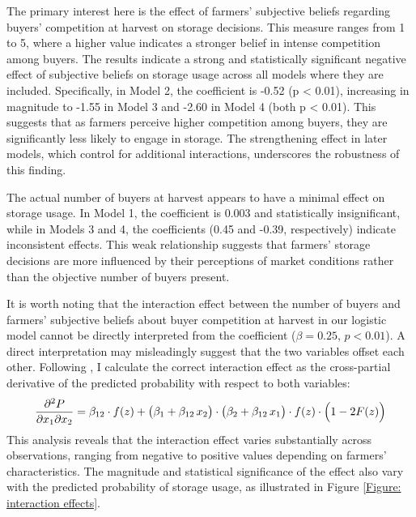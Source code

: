 \documentclass[12pt]{article}
\begin{document}


The primary interest here is the effect of farmers' subjective beliefs regarding buyers' competition at harvest on storage decisions. This measure ranges from 1 to 5, where a higher value indicates a stronger belief in intense competition among buyers. The results indicate a strong and statistically significant negative effect of subjective beliefs on storage usage across all models where they are included. Specifically, in Model 2, the coefficient is -0.52 (p < 0.01), increasing in magnitude to -1.55 in Model 3 and -2.60 in Model 4 (both p < 0.01). This suggests that as farmers perceive higher competition among buyers, they are significantly less likely to engage in storage. The strengthening effect in later models, which control for additional interactions, underscores the robustness of this finding.

The actual number of buyers at harvest appears to have a minimal effect on storage usage. In Model 1, the coefficient is 0.003 and statistically insignificant, while in Models 3 and 4, the coefficients (0.45 and -0.39, respectively) indicate inconsistent effects. This weak relationship suggests that farmers' storage decisions are more influenced by their perceptions of market conditions rather than the objective number of buyers present.

It is worth noting that the interaction effect between the number of buyers and farmers' subjective beliefs about buyer competition at harvest in our logistic model cannot be directly interpreted from the coefficient ($\beta = 0.25$, $p < 0.01$). A direct interpretation may misleadingly suggest that the two variables offset each other. Following \cite{ai2003interaction}, I calculate the correct interaction effect as the cross-partial derivative of the predicted probability with respect to both variables: $$\frac{\partial^2 P}{\partial x_1 \partial x_2} = \beta_{12} \cdot f(z) + \bigl(\beta_1 + \beta_{12} \, x_2\bigr) \cdot \bigl(\beta_2 + \beta_{12} \, x_1\bigr) \cdot f(z) \cdot \Bigl(1 - 2F(z)\Bigr)$$ This analysis reveals that the interaction effect varies substantially across observations, ranging from negative to positive values depending on farmers' characteristics. The magnitude and statistical significance of the effect also vary with the predicted probability of storage usage, as illustrated in Figure \ref{Figure: interaction effects}.
\end{document}

